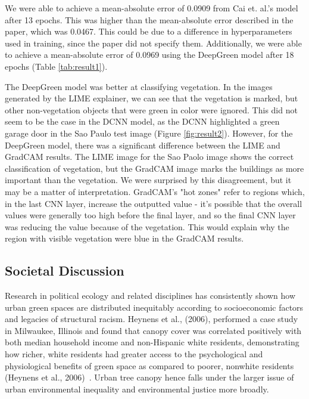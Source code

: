 We were able to achieve a mean-absolute error of 0.0909 from Cai et. al.’s model after 13 epochs. This was higher than the mean-absolute error described in the paper, which was 0.0467. This could be due to a difference in hyperparameters used in training, since the paper did not specify them. Additionally, we were able to achieve a mean-absolute error of 0.0969 using the DeepGreen model after 18 epochs (Table \ref{tab:result1}).

The DeepGreen model was better at classifying vegetation. In the images generated by the LIME explainer, we can see that the vegetation is marked, but other non-vegetation objects that were green in color were ignored. This did not seem to be the case in the DCNN model, as the DCNN highlighted a green garage door in the Sao Paulo test image (Figure \ref{fig:result2}). However, for the DeepGreen model, there was a significant difference between the LIME and GradCAM results. The LIME image for the Sao Paolo image shows the correct classification of vegetation, but the GradCAM image marks the buildings as more important than the vegetation. We were surprised by this disagreement, but it may be a matter of interpretation. GradCAM's "hot zones" refer to regions which, in the last CNN layer, increase the outputted value - it's possible that the overall values were generally too high before the final layer, and so the final CNN layer was reducing the value because of the vegetation. This would explain why the region with visible vegetation were blue in the GradCAM results.


\subsection{Societal Discussion}

Research in political ecology and related disciplines has consistently shown how urban green spaces are distributed inequitably according to socioeconomic factors and legacies of structural racism. Heynens et al., (2006), performed a case study in Milwaukee, Illinois and found that canopy cover was correlated positively with both median household income and non-Hispanic white residents, demonstrating how richer, white residents had greater access to the psychological and physiological benefits of green space as compared to poorer, nonwhite residents (Heynens et al., 2006)~\cite{Heynen2006}. Urban tree canopy hence falls under the larger issue of urban environmental inequality and environmental justice more broadly.  

